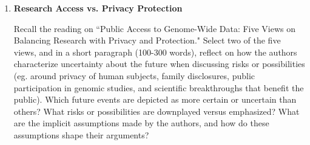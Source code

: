 \documentclass[11pt]{article}
\begin{document}
\begin{enumerate}[leftmargin=*]
		
		
		\item \textbf{Research Access vs. Privacy Protection} 
		
		Recall the reading on ``Public Access to Genome-Wide Data: Five Views on Balancing Research with Privacy and Protection." 
		Select two of the five views, and in a short paragraph (100-300 words), reflect on how the authors characterize uncertainty about the future when discussing risks or possibilities (eg. around privacy of human subjects, family disclosures, public participation in genomic studies, and scientific breakthroughs that benefit the public). Which future events are depicted as more certain or uncertain than others? What risks or possibilities are downplayed versus emphasized? What are the implicit assumptions made by the authors, and how do these assumptions shape their arguments?
	

	

\end{enumerate}
	
	
\end{document}
